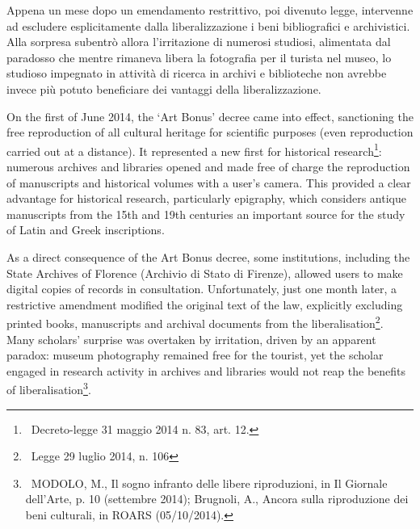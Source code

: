 \documentclass[amsthm,ebook]{saparticle}
\begin{document}
Appena un mese dopo un emendamento restrittivo, poi divenuto legge, intervenne ad escludere esplicitamente dalla
liberalizzazione i beni bibliografici e archivistici. Alla sorpresa subentrò allora l’irritazione di numerosi studiosi,
alimentata dal paradosso che mentre rimaneva libera la fotografia per il turista nel museo, lo studioso impegnato in
attività di ricerca in archivi e biblioteche non avrebbe invece più potuto beneficiare dei vantaggi della
liberalizzazione. 

On the first of June 2014, the ‘Art Bonus’ decree came into effect, sanctioning the free reproduction of all cultural
heritage for scientific purposes (even reproduction carried out at a distance). It represented a new first for
historical research\footnote{\ Decreto-legge 31 maggio 2014 n. 83, art. 12.}: numerous archives and libraries opened
and made free of charge the reproduction of manuscripts and historical volumes with a user’s camera. This provided a
clear advantage for historical research, particularly epigraphy, which considers antique manuscripts from the 15th and
19th centuries an important source for the study of Latin and Greek inscriptions. 

As a direct consequence of the Art Bonus decree, some institutions, including the State Archives of Florence (Archivio
di Stato di Firenze), allowed users to make digital copies of records in consultation. Unfortunately, just one month
later, a restrictive amendment modified the original text of the law, explicitly excluding printed books, manuscripts
and archival documents from the liberalisation\footnote{\ Legge 29 luglio 2014, n. 106}. Many scholars’ surprise was
overtaken by irritation, driven by an apparent paradox: museum photography remained free for the tourist, yet the
scholar engaged in research activity in archives and libraries would not reap the benefits of
liberalisation\footnote{\ MODOLO, M., Il sogno infranto delle libere riproduzioni, in Il Giornale dell’Arte, p. 10
(settembre 2014); Brugnoli, A., Ancora sulla riproduzione dei beni culturali, in ROARS (05/10/2014).\par }.


\bigskip
\end{document}
